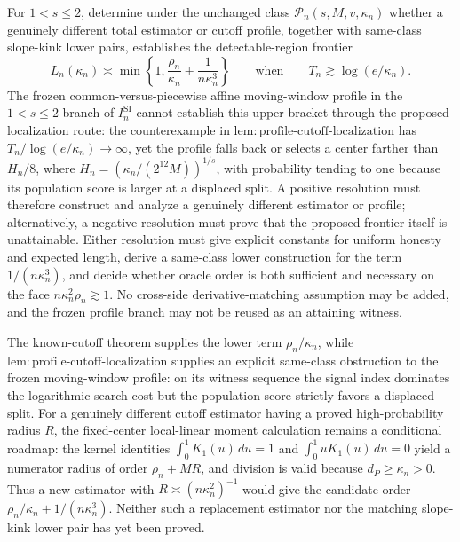 For \(1<s\le2\), determine under the unchanged class
\(\mathcal P_n(s,M,v,\kappa_n)\) whether a genuinely different total
estimator or cutoff profile, together with same-class slope-kink lower
pairs, establishes the detectable-region frontier
\[
 L_n(\kappa_n)\asymp
 \min\left\{1,\frac{\rho_n}{\kappa_n}
                  +\frac1{n\kappa_n^3}\right\}
 \qquad\text{when}\qquad
 T_n\gtrsim\log(e/\kappa_n).
\]
The frozen common-versus-piecewise affine moving-window profile in the
\(1<s\le2\) branch of \(I_n^{\mathrm{SI}}\) cannot establish this upper
bracket through the proposed localization route:
the counterexample in
\(\mathrm{lem:profile\mbox{-}cutoff\mbox{-}localization}\) has
\(T_n/\log(e/\kappa_n)\to\infty\), yet the profile falls back or selects
a center farther than \(H_n/8\), where
\(H_n=(\kappa_n/(2^{12}M))^{1/s}\), with probability tending to one
because its population score is larger at a displaced split.  A positive
resolution must therefore construct and analyze a genuinely different
estimator or profile; alternatively, a negative resolution must prove
that the proposed frontier itself is unattainable.  Either resolution
must give explicit constants for uniform honesty and expected length,
derive a same-class lower construction for the term
\(1/(n\kappa_n^3)\), and decide whether oracle order is both sufficient
and necessary on the face \(n\kappa_n^2\rho_n\gtrsim1\).  No
cross-side derivative-matching assumption may be added, and the frozen
profile branch may not be reused as an attaining witness.

The known-cutoff theorem supplies the lower term
\(\rho_n/\kappa_n\), while
\(\mathrm{lem:profile\mbox{-}cutoff\mbox{-}localization}\) supplies an
explicit same-class obstruction to the frozen moving-window profile:
on its witness sequence the signal index dominates the logarithmic
search cost but the population score strictly favors a displaced split.
For a genuinely different cutoff estimator having a proved
high-probability radius \(R\), the fixed-center local-linear moment
calculation remains a conditional roadmap: the kernel identities
\(\int_0^1K_1(u)\,du=1\) and
\(\int_0^1uK_1(u)\,du=0\) yield a numerator radius of order
\(\rho_n+MR\), and division is valid because
\(d_P\ge\kappa_n>0\).  Thus a new estimator with
\(R\asymp(n\kappa_n^2)^{-1}\) would give the candidate order
\(\rho_n/\kappa_n+1/(n\kappa_n^3)\).  Neither such a replacement
estimator nor the matching slope-kink lower pair has yet been proved.


